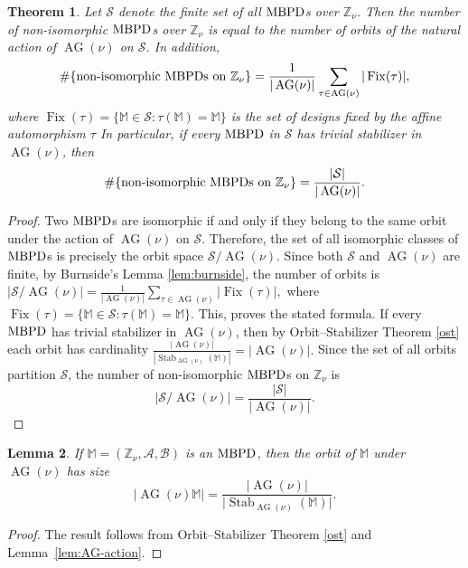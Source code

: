 \documentclass[preprint,11pt]{elsarticle}
\newcommand{\MBPD}{\textnormal{MBPD}}
\newcommand{\AG}{\operatorname{AG}}
\newtheorem{theorem}{Theorem}[section]
\newtheorem{lemma}[theorem]{Lemma}
\begin{document}
\begin{theorem}
\label{thm:iso-count}
Let $\mathcal S$ denote the finite set of all $\MBPD$s over $\mathbb Z_\nu$. Then the number of non-isomorphic $\MBPD$s over $\mathbb Z_\nu$ is equal to the number of orbits of the natural action of $\AG(\nu)$ on $\mathcal S$. In addition,
\[
\#\{\text{non-isomorphic $\MBPD$s on }\mathbb Z_\nu\}
=
\frac{1}{|\AG(\nu)|}
\sum_{\tau\in \AG(\nu)}
|\operatorname{Fix}(\tau)|,
\]
where
\(
\operatorname{Fix}(\tau)
=
\{\mathbb M\in\mathcal S:\tau(\mathbb M)=\mathbb M\}
\) is the set of designs fixed by the affine automorphism $\tau$ In particular, if every $\MBPD$ in $\mathcal S$ has trivial stabilizer in $\AG(\nu)$, then
\[
\#\{\text{non-isomorphic $\MBPD$s on }\mathbb Z_\nu\}
=
\frac{|\mathcal S|}{|\AG(\nu)|}.
\]
\end{theorem}
\begin{proof}
Two $\MBPD$s are isomorphic if and only if they belong to the same orbit under the action of $\AG(\nu)$ on $\mathcal S$. Therefore, the set of all isomorphic classes of $\MBPD$s is precisely the orbit space $\mathcal S/\AG(\nu)$.
Since both $\mathcal S$ and $\AG(\nu)$ are finite, by Burnside's Lemma \ref{lem:burnside}, the number of orbits is
$
|\mathcal S/\AG(\nu)|
=
\frac{1}{|\AG(\nu)|}
\sum_{\tau\in \AG(\nu)}
|\operatorname{Fix}(\tau)|,
$
where
\(
\operatorname{Fix}(\tau)
=
\{\mathbb M\in\mathcal S:\tau(\mathbb M)=\mathbb M\}.
\)
This, proves the stated formula. If every $\MBPD$ has trivial stabilizer in $\AG(\nu)$, then by Orbit--Stabilizer Theorem \ref{ost} each orbit has cardinality
$
\frac{|\AG(\nu)|}
{|\operatorname{Stab}_{\AG(\nu)}(\mathbb M)|}
=
|\AG(\nu)|.$
Since the set of all orbits partition $\mathcal S$, the number of non-isomorphic $\MBPD$s on $\mathbb{Z}_\nu$ is 
\[
|\mathcal S/\AG(\nu)|
=
\frac{|\mathcal S|}{|\AG(\nu)|}.
\]
 
\end{proof}


\begin{lemma}
\label{thm:orbit-count}
If $\mathbb M=(\mathbb Z_\nu,\mathcal A,\mathcal B)$ is an $\MBPD$, then the orbit of $\mathbb M$ under $\AG(\nu)$ has size
\[
|\AG(\nu)\mathbb M|
= \frac{|\AG(\nu)|}{\big|\operatorname{Stab}_{\AG(\nu)}(\mathbb M)\big|}.
\]
\end{lemma}

\begin{proof}
The result follows from  Orbit--Stabilizer Theorem \ref{ost} and Lemma~\ref{lem:AG-action}.
\end{proof}
\end{document}
